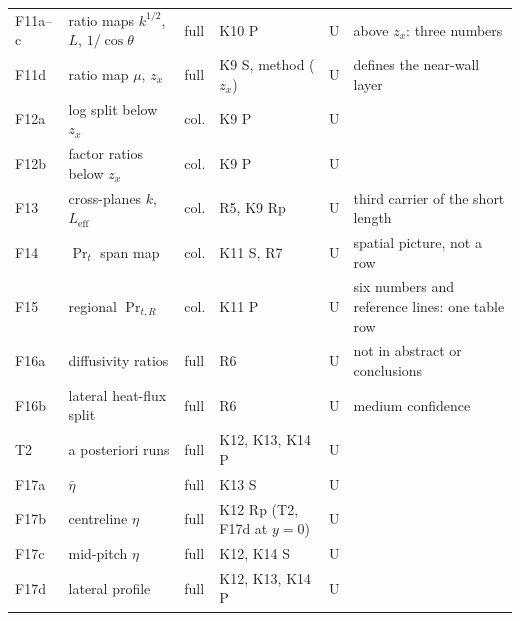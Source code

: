 \documentclass[10pt]{article}
\begin{document}
{\begin{longtable}{@{}L{1.0cm} L{3.9cm} L{0.9cm} L{3.4cm} L{0.7cm} L{6.3cm}@{}}
F11a--c & ratio maps $k^{1/2}$, $L$, $1/\cos\theta$ & full & K10 P & U & above $z_x$: three numbers \\
F11d & ratio map $\mu$, $z_x$ & full & K9 S, method ($z_x$) & U & defines the near-wall layer \\
F12a & log split below $z_x$ & col. & K9 P & U & \\
F12b & factor ratios below $z_x$ & col. & K9 P & U & \\
F13 & cross-planes $k$, $L_{\mathrm{eff}}$ & col. & R5, K9 Rp & U & third carrier of the short length \\
F14 & $\Pr_t$ span map & col. & K11 S, R7 & U & spatial picture, not a row \\
F15 & regional $\Pr_{t,R}$ & col. & K11 P & U & six numbers and reference lines: one table row \\
F16a & diffusivity ratios & full & R6 & U & not in abstract or conclusions \\
F16b & lateral heat-flux split & full & R6 & U & medium confidence \\
T2 & a posteriori runs & full & K12, K13, K14 P & U & \\
F17a & $\bar\eta$ & full & K13 S & U & \\
F17b & centreline $\eta$ & full & K12 Rp (T2, F17d at $y=0$) & U & \\
F17c & mid-pitch $\eta$ & full & K12, K14 S & U & \\
F17d & lateral profile & full & K12, K13, K14 P & U & \\
\bottomrule
\end{longtable}}

\end{document}
